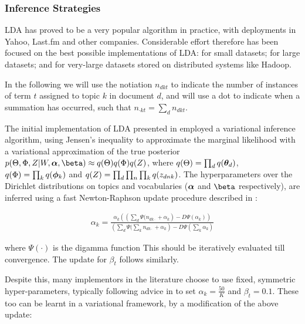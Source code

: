 

\subsubsection{Inference Strategies}
LDA has proved to be a very popular algorithm in practice, with deployments in Yahoo, Last.fm and other companies. Considerable effort therefore has been focused on the best possible implementations of LDA: for small datasets; for large datasets; and for very-large datasets stored on distributed systems like Hadoop.

In the following we will use the notiation $n_{dkt}$ to indicate the number of instances of term $t$ assigned to topic $k$ in document $d$, and will use a dot to indicate when a summation has occurred, such that $n_{\cdot k t} = \sum_d n_{dkt}$.



The initial implementation of LDA presented in \cite{BleiNgJordan2003} employed a variational inference algorithm\cite{Bernardo2003}, using Jensen's inequality to approximate the marginal likelihood with a variational approximation of the true posterior $p(\Theta,\Phi,Z|W,\vv{\alpha},\vv{\beta}) \approx q(\Theta)q(\Phi)q(Z) $, where $q(\Theta) = \prod_d q({ \bm \theta_d })$, $q(\Phi) = \prod_k q({ \bm \phi_k })$ and $q(Z) = \prod_d \prod_n \prod_k q({ z_{dnk} })$. The hyperparameters over the Dirichlet distributions on topics and vocabularies ($\bm \alpha$ and $\vv{\beta}$ respectively), are inferred using a fast Newton-Raphson update procedure described in \cite{Minka2000}:

\begin{align}
\alpha_k = \frac{\alpha_k \left( \left(\sum_d \Psi(n_{dk\cdot} + \alpha_k \right) - D \Psi (\alpha_k)\right)}{\left(\sum_d  \Psi(\sum_k n_{dk\cdot} + \alpha_k \right) - D \Psi (\sum_k \alpha_k)}
\end{align}

where $\Psi(\cdot)$ is the digamma function This should be iteratively evaluated till convergence. The update for $\beta_t$ follows similarly.

Despite this, many implementors in the literature choose to use fixed, symmetric hyper-parameters, typically following advice in \cite{Griffiths2004} to set $\alpha_k = \frac{50}{K}$ and $\beta_t=0.1$. These too can be learnt in a variational framework, by a modification of the above update\cite{Heinrich2005}:

